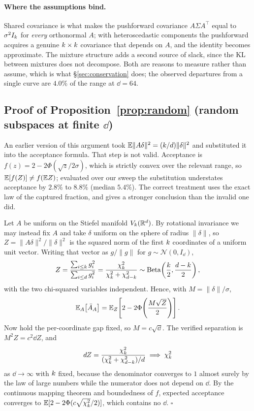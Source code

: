 \paragraph{Where the assumptions bind.} Shared covariance is what makes the pushforward covariance
$A\Sigma A^\top$ equal to $\sigma^2 I_k$ for \emph{every} orthonormal $A$; with heteroscedastic
components the pushforward acquires a genuine $k\times k$ covariance that depends on $A$, and the
identity becomes approximate. The mixture structure adds a second source of slack, since the KL
between mixtures does not decompose. Both are reasons to measure rather than assume, which is what
\S\ref{sec:conservation} does; the observed departures from a single curve are $4.0\%$ of the range at
$\dd{=}64$.

\subsection{Proof of Proposition~\ref{prop:random} (random subspaces at finite $\dd$)}
\label{app:random}

An earlier version of this argument took $\mathbb{E}\|A\delta\|^2 = (k/d)\|\delta\|^2$ and substituted it
into the acceptance formula. That step is not valid. Acceptance is
$f(z) = 2 - 2\Phi(\sqrt{z}/2\sigma)$, which is strictly convex over the relevant range, so
$\mathbb{E}[f(Z)] \neq f(\mathbb{E} Z)$; evaluated over our sweep the substitution understates acceptance by $2.8\%$
to $8.8\%$ (median $5.4\%$). The correct treatment uses the exact law of the captured fraction, and
gives a stronger conclusion than the invalid one did.

Let $A$ be uniform on the Stiefel manifold $V_k(\mathbb{R}^d)$. By rotational invariance we may instead
fix $A$ and take $\delta$ uniform on the sphere of radius $\|\delta\|$, so
$Z = \|A\delta\|^2/\|\delta\|^2$ is the squared norm of the first $k$ coordinates of a uniform unit
vector. Writing that vector as $g/\|g\|$ for $g \sim \mathcal{N}(0, I_\dd)$,
\[
Z = \frac{\sum_{i\le k} g_i^2}{\sum_{i \le d} g_i^2}
  = \frac{\chi^2_k}{\chi^2_k + \chi^2_{d-k}}
  \sim \operatorname{Beta}\!\left(\frac{k}{2}, \frac{d-k}{2}\right),
\]
with the two chi-squared variables independent. Hence, with $M = \|\delta\|/\sigma$,
\[
\mathbb{E}_A\bigl[\bar A_A\bigr] = \mathbb{E}_Z\!\left[2 - 2\Phi\!\left(\frac{M\sqrt{Z}}{2}\right)\right].
\]
Now hold the per-coordinate gap fixed, so $M = c\sqrt{\dd}$. The verified separation is
$M^2 Z = c^2 \dd Z$, and
\[
d Z = \frac{\chi^2_k}{(\chi^2_k + \chi^2_{d-k})/d} \;\Longrightarrow\; \chi^2_k
\]
as $\dd \to \infty$ with $k$ fixed, because the denominator converges to $1$ almost surely by the
law of large numbers while the numerator does not depend on $\dd$. By the continuous mapping theorem
and boundedness of $f$, expected acceptance converges to $\mathbb{E}[2 - 2\Phi(c\sqrt{\chi^2_k}/2)]$, which
contains no $\dd$. $\square$


